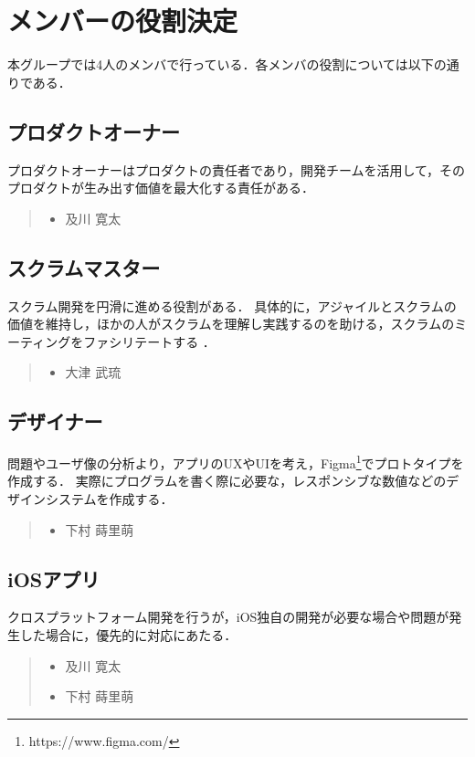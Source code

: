 \section{メンバーの役割決定}
本グループでは4人のメンバで行っている．各メンバの役割については以下の通りである．

\subsection{プロダクトオーナー}
プロダクトオーナーはプロダクトの責任者であり，開発チームを活用して，そのプロダクトが生み出す価値を最大化する責任がある\cite{scrum}．
\begin{quote}
    \begin{itemize}
        \item 及川 寛太
    \end{itemize}
\end{quote}

\subsection{スクラムマスター}
スクラム開発を円滑に進める役割がある．
具体的に，アジャイルとスクラムの価値を維持し，ほかの人がスクラムを理解し実践するのを助ける，スクラムのミーティングをファシリテートする \cite{scrummaster}．
\begin{quote}
    \begin{itemize}
        \item 大津 武琉
    \end{itemize}
\end{quote}

\subsection{デザイナー}
問題やユーザ像の分析より，アプリのUXやUIを考え，Figma\footnote{https://www.figma.com/}でプロトタイプを作成する．
実際にプログラムを書く際に必要な，レスポンシブな数値などのデザインシステムを作成する．
\begin{quote}
    \begin{itemize}
        \item 下村 蒔里萌
    \end{itemize}
\end{quote}

\subsection{iOSアプリ}
クロスプラットフォーム開発を行うが，iOS独自の開発が必要な場合や問題が発生した場合に，優先的に対応にあたる．
\begin{quote}
    \begin{itemize}
        \item 及川 寛太
        \item 下村 蒔里萌
    \end{itemize}
\end{quote}


